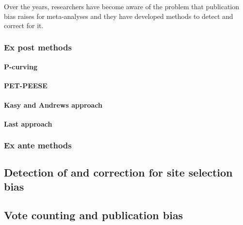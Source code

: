\documentclass[]{book}
\let\oldparagraph\paragraph
\renewcommand{\paragraph}[1]{\oldparagraph{#1}\mbox{}}
\theoremstyle{definition}
\theoremstyle{definition}
\theoremstyle{definition}
\theoremstyle{remark}
\begin{document}
Over the years, researchers have become aware of the problem that publication bias raises for meta-analyses and they have developed methods to detect and correct for it.

\hypertarget{ex-post-methods}{%
\subsubsection{Ex post methods}\label{ex-post-methods}}

\hypertarget{p-curving}{%
\paragraph{P-curving}\label{p-curving}}

\hypertarget{pet-peese}{%
\paragraph{PET-PEESE}\label{pet-peese}}

\hypertarget{kasy-and-andrews-approach}{%
\paragraph{Kasy and Andrews approach}\label{kasy-and-andrews-approach}}

\hypertarget{last-approach}{%
\paragraph{Last approach}\label{last-approach}}

\hypertarget{ex-ante-methods}{%
\subsubsection{Ex ante methods}\label{ex-ante-methods}}

\hypertarget{detection-of-and-correction-for-site-selection-bias}{%
\subsection{Detection of and correction for site selection bias}\label{detection-of-and-correction-for-site-selection-bias}}

\hypertarget{vote-counting-and-publication-bias}{%
\subsection{Vote counting and publication bias}\label{vote-counting-and-publication-bias}}
\end{document}
